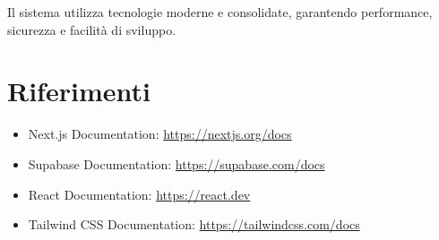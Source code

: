 \documentclass{article}
\begin{document}
Il sistema utilizza tecnologie moderne e consolidate, garantendo performance, sicurezza e facilità di sviluppo.

\section{Riferimenti}

\begin{itemize}
\item Next.js Documentation: \url{https://nextjs.org/docs}
\item Supabase Documentation: \url{https://supabase.com/docs}
\item React Documentation: \url{https://react.dev}
\item Tailwind CSS Documentation: \url{https://tailwindcss.com/docs}
\end{itemize}
\end{document}
